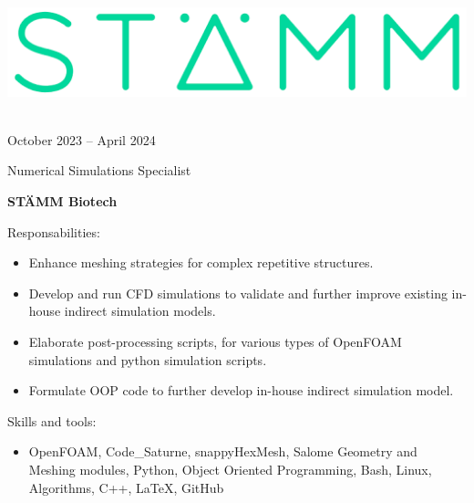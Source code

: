 \documentclass[a4paper,10pt]{article}
\newlength{\cvcolumngapwidth}
\newlength{\cvleftcolumnwidth}
\newlength{\cvrightcolumnwidth}
\newcommand{\cvtitlestyle}[1]{{\large\cvtitlefont\textcolor{cvtitlecolor}{#1}}}
\newcommand{\cvdurationstyle}[1]{{\small\cvdurationfont\textcolor{cvdurationcolor}{#1}}}
\newlength{\cvafteritemskipamount}
\newlength{\cvaftertitleskipamount}
\newlength{\cvparskip}
\newcommand{\cvitem}[2]{
    \begin{minipage}[t]{\cvleftcolumnwidth}
        \raggedleft #1
    \end{minipage}%
    \hspace{\cvcolumngapwidth}%
    \begin{minipage}[t]{\cvrightcolumnwidth}
        \setlength{\parskip}{\cvparskip} #2
    \end{minipage}

    \vspace{\cvafteritemskipamount}
}
\newcommand{\cvtitle}[1]{
    \cvtitlestyle{#1}

    \vspace{\cvaftertitleskipamount}
    \vspace{-\cvparskip}
}
\begin{document}
\cvitem{
	\begin{minipage}{\textwidth}
    \begin{flushright}
		  \includegraphics[height=0.15\textwidth]{../logos-photos/Logo_STAMM.png}   
    \end{flushright}  
  \end{minipage} \\
  \vspace{0.3cm}
  \cvdurationstyle{October 2023 -- April 2024}\\
}{
	
  \cvtitle{Numerical Simulations Specialist}
  \textbf{\large STÄMM Biotech}
  
  Responsabilities:
  \begin{itemize}
    \item Enhance meshing strategies for complex repetitive structures. 
    \item Develop and run CFD simulations to validate and further improve existing in-house indirect simulation models.
    \item Elaborate post-processing scripts, for various types of OpenFOAM simulations and python simulation scripts.
    \item Formulate OOP code to further develop in-house indirect simulation model.
  \end{itemize}
  
  Skills and tools:
  \begin{itemize}
    \item OpenFOAM, Code\_Saturne, snappyHexMesh, Salome Geometry and Meshing modules, Python, Object Oriented
      Programming, Bash, Linux, Algorithms, C++, LaTeX, GitHub
  \end{itemize}
	
}
\end{document}
